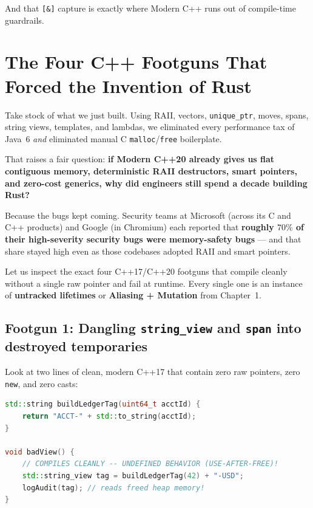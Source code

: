 And that \texttt{[\&]} capture is exactly where Modern C++ runs out of compile-time guardrails.

\section{The Four C++ Footguns That Forced the Invention of Rust}
\label{ch02:four-footguns}

Take stock of what we just built. Using RAII, vectors, \texttt{unique\_ptr}, moves, spans, string views, templates, and lambdas, we eliminated every performance tax of Java~6 \emph{and} eliminated manual C \texttt{malloc}/\texttt{free} boilerplate.

That raises a fair question: \textbf{if Modern C++20 already gives us flat contiguous memory, deterministic RAII destructors, smart pointers, and zero-cost generics, why did engineers still spend a decade building Rust?}

Because the bugs kept coming. Security teams at Microsoft (across its C and C++ products) and Google (in Chromium) each reported that \textbf{roughly $70\%$ of their high-severity security bugs were memory-safety bugs} --- and that share stayed high even as those codebases adopted RAII and smart pointers.

Let us inspect the exact four C++17/C++20 footguns that compile cleanly without a single raw pointer and fail at runtime. Every single one is an instance of \textbf{untracked lifetimes} or \textbf{Aliasing + Mutation} from Chapter~1.

\subsection{Footgun 1: Dangling \texttt{string\_view} and \texttt{span} into destroyed temporaries}

Look at two lines of clean, modern C++17 that contain zero raw pointers, zero \texttt{new}, and zero casts:

\begin{lstlisting}[language=C++]
std::string buildLedgerTag(uint64_t acctId) {
    return "ACCT-" + std::to_string(acctId);
}

void badView() {
    // COMPILES CLEANLY -- UNDEFINED BEHAVIOR (USE-AFTER-FREE)!
    std::string_view tag = buildLedgerTag(42) + "-USD";
    logAudit(tag); // reads freed heap memory!
}
\end{lstlisting}

